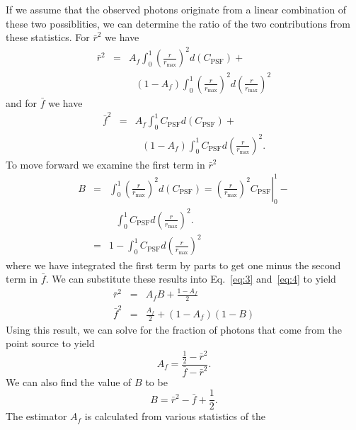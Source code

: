 \documentclass[useAMS,usenatbib]{mn2e}
\begin{document}
If we assume that the observed photons originate from a linear
combination of these two possiblities, we can determine the ratio of
the two contributions from these statistics.  For $\bar r^2$ we have
\begin{eqnarray}
  \bar r^2 &=& A_f \int_0^1 \left (\frac{r}{r_\mathrm{max}} \right )^2 d \left (C_\mathrm{PSF} \right ) + \\
  & & ~~~ 
   (1 - A_f) \int_0^1 \left (\frac{r}{r_\mathrm{max}} \right )^2 d \left (\frac{r}{r_\mathrm{max}} \right )^2 \nonumber
    \label{eq:3}
\end{eqnarray}
and for $\bar f$ we have
\begin{eqnarray}
  \bar f^2 &=& A_f \int_0^1 C_\mathrm{PSF}  d \left (C_\mathrm{PSF} \right ) + \\
  & & ~~~  (1 - A_f) \int_0^1 C_\mathrm{PSF} d \left (\frac{r}{r_\mathrm{max}} \right )^2.
    \nonumber
    \label{eq:4}
\end{eqnarray}
To move forward we examine the first term in $\bar r^2$
\begin{eqnarray}
  B &=& \int_0^1 \left (\frac{r}{r_\mathrm{max}} \right )^2 d \left (C_\mathrm{PSF} \right )
  = \left . \left (\frac{r}{r_\mathrm{max}} \right )^2 C_\mathrm{PSF} \right |_0^1 - \\
  \label{eq:5}
  & & ~~~  \int_0^1 C_\mathrm{PSF} d \left (\frac{r}{r_\mathrm{max}} \right )^2. \nonumber \\
  &=& 1 - \int_0^1 C_\mathrm{PSF} d \left (\frac{r}{r_\mathrm{max}} \right )^2
  \label{eq:6}
\end{eqnarray}
where we have integrated the first term by parts to get one minus the
second term in $\bar f$.  We can substitute these results into
Eq.~\ref{eq:3} and~\ref{eq:4} to yield
\begin{eqnarray}
  \bar r^2 &=& A_f B + \frac{1-A_f}{2} \label{eq:7}
  \\
  \bar f^2 &=& \frac{A_f}{2} + (1 - A_f) (1 - B) \label{eq:8}
\end{eqnarray}
Using this result, we can solve for the fraction of photons that come
from the point source to yield
\begin{equation}
  A_f=\frac{\frac{1}{2}-\bar r^2}{\bar f-\bar r^2}.
  \label{eq:9}
\end{equation} 
We can also find the value of $B$ to be
\begin{equation}
  B = \bar r^2 - \bar f + \frac{1}{2}.
  \label{eq:10}
\end{equation}
The estimator $A_f$ is calculated from various statistics of the
\end{document}
